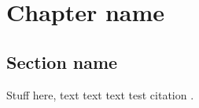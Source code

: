 \documentclass[a4paper,11pt,twoside,openright]{scrbook}
\begin{document}
\chapter{Chapter name} \label{chapter:moa}

\section{Section name}
Stuff here, text text text test citation \cite{Yang2018}.

\end{document}
